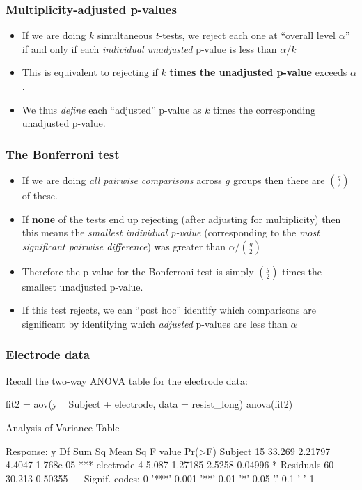 \documentclass[a4paper]{article}\usepackage[]{graphicx}\usepackage[]{xcolor}
\begin{document}
\subsubsection{Multiplicity-adjusted p-values}
\begin{itemize}
	\item If we are doing \( k \) simultaneous \( t \)-tests, we reject each one at ``overall level \( \alpha \)'' if and only if each \textit{individual unadjusted} p-value is less than \( \alpha / k \)
	\item This is equivalent to rejecting if \( k \) \textbf{times the unadjusted p-value} exceeds \( \alpha \).
	\item We thus \textit{define} each ``adjusted'' p-value as \( k \) times the corresponding unadjusted p-value.
\end{itemize}
\subsubsection{The Bonferroni test}
\begin{itemize}
	\item If we are doing \textit{all pairwise comparisons} across \( g \) groups then there are \( \binom{g}{2} \) of these.
	\item If \textbf{none} of the tests end up rejecting (after adjusting for multiplicity) then this means the \textit{smallest individual p-value} (corresponding to the \textit{most significant pairwise difference}) was greater than \( \alpha / \binom{g}{2} \) 
	\item Therefore the p-value for the Bonferroni test is simply \( \binom{g}{2} \) times the smallest unadjusted p-value.
	\item If this test rejects, we can ``post hoc'' identify which comparisons are significant by identifying which \textit{adjusted} p-values are less than \( \alpha \) 
\end{itemize}
\subsubsection{Electrode data}
Recall the two-way ANOVA table for the electrode data:
\begin{Schunk}
\begin{Sinput}
fit2 = aov(y ~ Subject + electrode, data = resist_long)
anova(fit2)
\end{Sinput}
\begin{Soutput}
Analysis of Variance Table

Response: y
          Df Sum Sq Mean Sq F value    Pr(>F)    
Subject   15 33.269 2.21797  4.4047 1.768e-05 ***
electrode  4  5.087 1.27185  2.5258   0.04996 *  
Residuals 60 30.213 0.50355                      
---
Signif. codes:  0 '***' 0.001 '**' 0.01 '*' 0.05 '.' 0.1 ' ' 1
\end{Soutput}
\end{Schunk}
\end{document}
